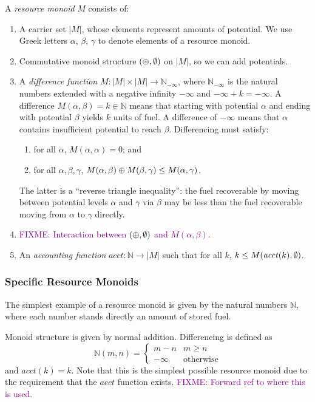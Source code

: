 \documentclass[acmsmall,review]{acmart}
\newcommand{\natinf}{\mathbb{N}_{-\infty}}
\newcommand{\bob}[1]{\textcolor{purple}{FIXME: #1}}
\begin{document}
\begin{definition}
  A \emph{resource monoid} $M$ consists of:
  \begin{enumerate}
  \item A carrier set $|M|$, whose elements represent amounts of
    potential. We use Greek letters $\alpha$, $\beta$, $\gamma$ to
    denote elements of a resource monoid.
  \item Commutative monoid structure $(\oplus,\emptyset)$ on $|M|$, so
    we can add potentials.
  \item A \emph{difference function} $M : |M| \times |M| \to \natinf$,
    where $\natinf$ is the natural numbers extended with a negative
    infinity $- \infty$ and $- \infty + k = -\infty$. A difference
    $M(\alpha, \beta) = k \in \mathbb{N}$ means that starting with
    potential $\alpha$ and ending with potential $\beta$ yields $k$
    units of fuel. A difference of $- \infty$ means that $\alpha$
    contains insufficient potential to reach $\beta$. Differencing
    must satisfy:
    \begin{enumerate}
    \item for all $\alpha$, $M(\alpha,\alpha) = 0$; and
    \item for all $\alpha, \beta, \gamma$,
      $M(\alpha, \beta) \oplus M(\beta, \gamma) \leq M(\alpha, \gamma)$.
    \end{enumerate}
    The latter is a ``reverse triangle inequality'': the fuel
    recoverable by moving between potential levels $\alpha$ and
    $\gamma$ via $\beta$ may be less than the fuel recoverable
    moving from $\alpha$ to $\gamma$ directly.
  \item \bob{Interaction between $(\oplus,\emptyset)$ and $M(\alpha,\beta)$.}
  \item An \emph{accounting function}
    $\mathit{acct} : \mathbb{N} \to |M|$ such that for all $k$,
    $k \leq M(\mathit{acct}(k),\emptyset)$.
  \end{enumerate}
\end{definition}

\subsubsection{Specific Resource Monoids}

The simplest example of a resource monoid is given by the natural
numbers $\mathbb{N}$, where each number stands directly an amount of
stored fuel.

\begin{definition}
  Monoid structure is given by normal addition. Differencing is
  defined as
  \begin{displaymath}
    \mathbb{N}(m,n) = \left\{
      \begin{array}{ll}
        m - n & m \geq n \\
        - \infty & \textrm{otherwise}
      \end{array}\right.
  \end{displaymath}
  and $\mathit{acct}(k) = k$. Note that this is the simplest possible
  resource monoid due to the requirement that the $\mathit{acct}$
  function exists. \bob{Forward ref to where this is used.}
\end{definition}
\end{document}
